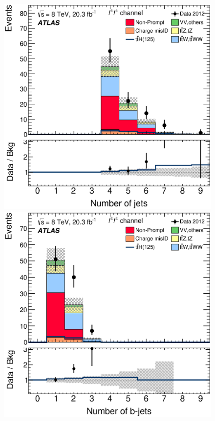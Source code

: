 \begin{figure}[!htbp]
  \begin{minipage}[h]{0.4\textwidth}
    \centering \includegraphics[width=\textwidth]{figs/results/results_new/2lep_SR_NJet}
  \end{minipage}\hfill
  \begin{minipage}[h]{0.4\textwidth}
    \centering \includegraphics[width=\textwidth]{figs/results/results_new/2lep_SR_NJetBTag}

\end{minipage}
\end{figure}
